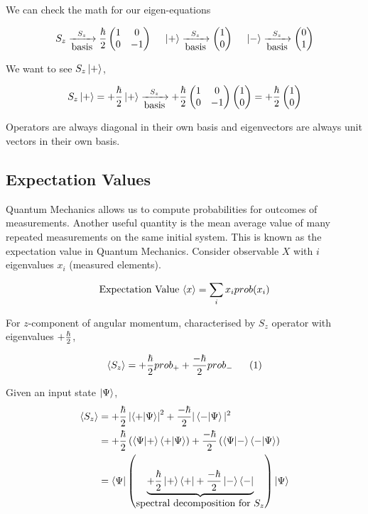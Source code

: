 \documentclass[english, 11pt]{article}
\begin{document}
      We can check the math for our eigen-equations

      \[ S_z \xrightarrow[\mbox{basis}]{S_z} \frac{\hbar}{2}\left(\begin{matrix}1 & 0 \\ 0 & -1\end{matrix}\right) \ \ \ \ \left|+\right\rangle \xrightarrow[\mbox{basis}]{S_z} \left(\begin{matrix}1 \\ 0\end{matrix}\right) \ \ \ \ \left|-\right\rangle \xrightarrow[\mbox{basis}]{S_z} \left(\begin{matrix}0 \\ 1\end{matrix}\right) \]

      We want to see $S_z\left|+\right\rangle$,

      \[ S_z\left|+\right\rangle = +\frac{\hbar}{2} \left|+\right\rangle\xrightarrow[\mbox{basis}]{S_z} +\frac{\hbar}{2}\left(\begin{matrix}1 & 0 \\ 0 & -1\end{matrix}\right)\left(\begin{matrix}1 \\ 0\end{matrix}\right) = +\frac{\hbar}{2}\left(\begin{matrix}1\\0\end{matrix}\right) \]

      \begin{note}
        Operators are always diagonal in their own basis and eigenvectors are always unit vectors in their own basis.
      \end{note}

    \subsection{Expectation Values}

      Quantum Mechanics allows us to compute probabilities for outcomes of measurements. Another useful quantity is the mean average value of many repeated measurements on the same initial system. This is known as the expectation value in Quantum Mechanics. Consider observable $X$ with $i$ eigenvalues $x_i$ (measured elements).

      \[ \mbox{Expectation Value } \langle x \rangle = \sum_i x_i prob(x_i) \]

      For $z$-component of angular momentum, characterised by $S_z$ operator with eigenvalues $+\frac{\hbar}{2}$,

      \[ \langle S_z \rangle = +\frac{\hbar}{2}prob_+ + \frac{-\hbar}{2}prob_- \ \ \ \ \ (1) \]

      Given an input state $\left|\Psi\right\rangle$,
      \begin{align*}
        \E{S_z} & = +\f{\hbar}{2} \left| \braket{+}{\Psi} \right|^2 + \f{-\hbar}{2} |\braket{-}{\Psi}|^2 \\
        & = +\f{\hbar}{2} \left( \braket{\Psi}{+}\braket{+}{\Psi} \right) + \f{-\hbar}{2} \left( \braket{\Psi}{-}\braket{-}{\Psi} \right) \\
        & = \bra{\Psi} \left( \underbrace{+\f{\hbar}{2} \ket{+}\bra{+} + \f{-\hbar}{2}\ket{-}\bra{-}}_{\mbox{spectral decomposition for $S_z$}} \right) \kpsi
      \end{align*}
\end{document}
